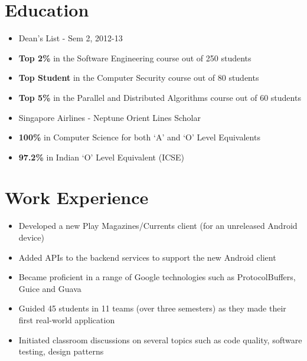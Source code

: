 \documentclass[11pt,a4paper]{moderncv}
\begin{document}
\makecvtitle

\section{Education}
{\begin{itemize}
    \item Dean's List - Sem 2, 2012-13
    \item \textbf{Top 2\%} in the Software Engineering course out of 250 students
    \item \textbf{Top Student} in the Computer Security course out of 80 students
    \item \textbf{Top 5\%} in the Parallel and Distributed Algorithms course out of 60 students
    \item Singapore Airlines - Neptune Orient Lines Scholar
 \end{itemize}}

{\begin{itemize}
            \item \textbf{100\%} in Computer Science for both `A' and `O' Level Equivalents
            \item \textbf{97.2\%} in Indian `O' Level Equivalent (ICSE)
 \end{itemize}}

\section{Work Experience}
{\begin{itemize}
        \item Developed a new Play Magazines/Currents client (for an unreleased Android device)
        \item Added APIs to the backend services to support the new Android client
        \item Became proficient in a range of Google technologies such as ProtocolBuffers, Guice and Guava
 \end{itemize}}
{\begin{itemize}
        \item Guided 45 students in 11 teams (over three semesters) as they made their first real-world application
        \item Initiated classroom discussions on several topics such as code quality, software testing, design patterns
 \end{itemize}}
\end{document}

